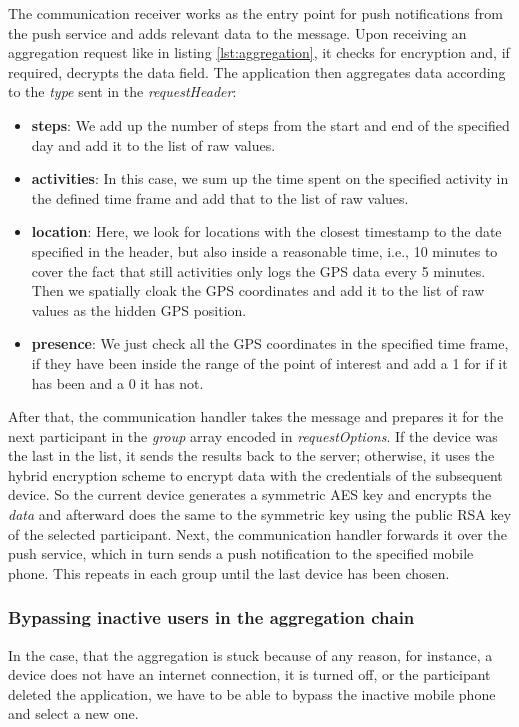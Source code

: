 The communication receiver works as the entry point for push notifications from the push service and adds relevant data to the message. Upon receiving an aggregation request like in listing \ref{lst:aggregation}, it checks for encryption and, if required, decrypts the data field. The application then aggregates data according to the \textit{type} sent in the \textit{requestHeader}:
\begin{itemize}
    \item \textbf{steps}: We add up the number of steps from the start and end of the specified day and add it to the list of raw values.
    \item \textbf{activities}: In this case, we sum up the time spent on the specified activity in the defined time frame and add that to the list of raw values.
    \item \textbf{location}: Here, we look for locations with the closest timestamp to the date specified in the header, but also inside a reasonable time, i.e., 10 minutes to cover the fact that still activities only logs the GPS data every 5 minutes. Then we spatially cloak the GPS coordinates and add it to the list of raw values as the hidden GPS position.
    \item \textbf{presence}: We just check all the GPS coordinates in the specified time frame, if they have been inside the range of the point of interest and add a 1 for if it has been and a 0 it has not.
\end{itemize}

After that, the communication handler takes the message and prepares it for the next participant in the \textit{group} array encoded in \textit{requestOptions}. If the device was the last in the list, it sends the results back to the server; otherwise, it uses the hybrid encryption scheme to encrypt data with the credentials of the subsequent device. So the current device generates a symmetric AES key and encrypts the \textit{data} and afterward does the same to the symmetric key using the public RSA key of the selected participant. Next, the communication handler forwards it over the push service, which in turn sends a push notification to the specified mobile phone. This repeats in each group until the last device has been chosen.

\subsubsection{Bypassing inactive users in the aggregation chain}
In the case, that the aggregation is stuck because of any reason, for instance, a device does not have an internet connection, it is turned off, or the participant deleted the application, we have to be able to bypass the inactive mobile phone and select a new one.

